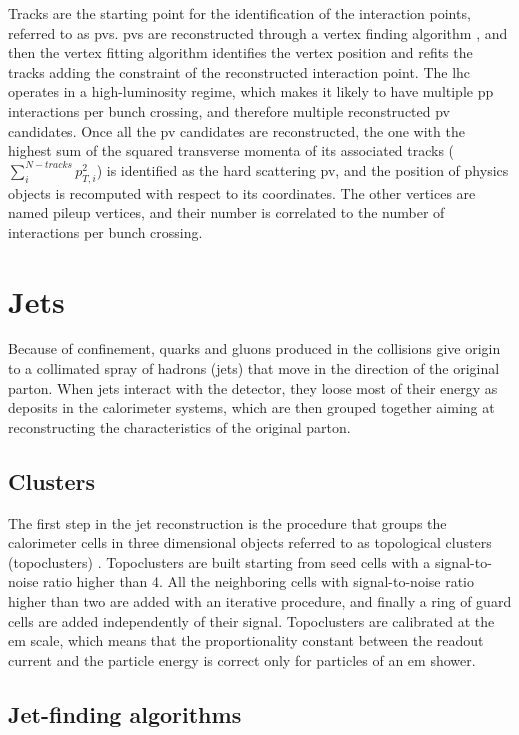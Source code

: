 Tracks are the starting point for the identification of the interaction points, referred to as \glspl{pv}. 
\glspl{pv} are reconstructed through a vertex finding algorithm \cite{Fruhwirth:2007hz}, 
and then the vertex fitting algorithm identifies the vertex position and refits the tracks 
adding the constraint of the reconstructed interaction point. 
The \gls{lhc} operates in a high-luminosity regime, which makes it likely to have multiple \gls{pp} interactions per bunch crossing, 
and therefore multiple reconstructed \gls{pv} candidates. 
Once all the \gls{pv} candidates are reconstructed, the one with the highest sum of the squared transverse momenta of its associated tracks ($\sum_i^{N-tracks}p_{T,i}^2$) is identified as the hard scattering \gls{pv}, and the position of physics objects is recomputed with respect to its coordinates. The other vertices are named pileup vertices, and their number is correlated  to the number of interactions per bunch crossing.


\section{Jets}

Because of confinement, quarks and gluons produced in the collisions give origin to a collimated spray of hadrons (jets) that move in the direction of the original parton. When jets interact with the detector, they loose most of their energy as deposits in the calorimeter systems, which are then grouped together aiming at reconstructing the characteristics of the original parton. 

\subsection{Clusters}
The first step in the jet reconstruction is the procedure that groups the calorimeter cells in three dimensional objects referred to as topological clusters (topoclusters) \cite{ATL-LARG-PUB-2008-002,Aad:2016upy}. Topoclusters are built starting from seed cells with a signal-to-noise ratio higher than 4. All the neighboring cells with signal-to-noise ratio higher than two are added with an iterative procedure, and finally a ring of guard cells are added independently of their signal.  
Topoclusters are calibrated at the \gls{em} scale, which means that the proportionality constant between the readout current and the particle energy is correct only for particles of an \gls{em} shower.

\subsection{Jet-finding algorithms}
\label{sec:obj:jetfinding}

